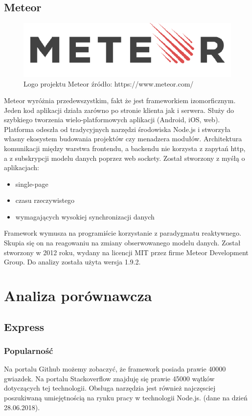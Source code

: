 \documentclass[12pt]{report}
\begin{document}
  \section{Meteor}
    \begin{figure}[!hb]
      \centering
      \includegraphics[width=\textwidth,height=\textheight,keepaspectratio]{logo_meteor.png} 
      \caption{Logo projektu Meteor \newline źródło: https://www.meteor.com/}
    \end{figure}
    Meteor wyróżnia przedewszystkim, fakt że jest frameworkiem izomorficznym. 
    Jeden kod aplikacji działa zarówno po stronie klienta jak i serwera.
    Służy do szybkiego tworzenia wielo-platformowych aplikacji (Android, iOS, web).
    Platforma odeszła od tradycyjnych narzędzi środowiska Node.js i stworzyła własny ekosystem budowania projektów czy menadzera modułów.
    Architektura komunikacji między warstwa frontendu, a backendu nie korzysta z zapytań http, a z subskrypcji modelu danych poprzez web sockety.
    Został stworzony z myśłą o aplikacjach:
    \begin{itemize}
      \item single-page 
      \item czasu rzeczywistego
      \item wymagających wysokiej synchronizacji danych
    \end{itemize} 
    Framework wymusza na programiście korzystanie z paradygmatu reaktywnego.
    Skupia się on na reagowaniu na zmiany obserwowanego modelu danych.
    Został stworzony w 2012 roku, wydany na licencji MIT przez firme Meteor Development Group.
    Do analizy została użyta wersja 1.9.2.

\chapter{Analiza porównawcza}

  \section{Express}
    \subsection{Popularność}
      Na portalu Github możemy zobaczyć, że framework posiada prawie 40000 gwiazdek.
      Na portalu Stackoverflow znajduję się prawie 45000 wątków dotyczących tej technologii.
      Obsługa narzędzia jest również najczęsciej poszukiwaną umiejętnością na rynku pracy w technologii Node.js.
      (dane na dzień 28.06.2018).
\end{document}
